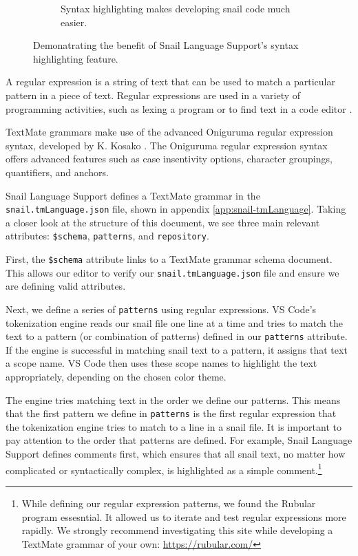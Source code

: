 \documentclass{article}
\begin{document}
\begin{figure}[b]
\begin{subfigure}[c][][c]{0.45\textwidth}
\begin{center}
            \caption{Syntax highlighting makes developing snail code much easier.}
            \label{fig:dev-with-highlight}
        \end{center}
    \end{subfigure}
    \caption{Demonatrating the benefit of Snail Language Support's syntax highlighting feature.}
    \label{fig:syntax-highlight}
\end{figure}

A regular expression is a string of text that can be used to match a particular pattern in a piece of text. Regular expressions are used in a variety of programming activities, such as lexing a program or to find text in a code editor \cite{ComputerHope_2022, Cornell_2022}. 

TextMate grammars make use of the advanced Oniguruma regular expression syntax, developed by K. Kosako \cite{Microsoft_2023h, MacroMates_2021b}. The Oniguruma regular expression syntax offers advanced features such as case insentivity options, character groupings, quantifiers, and anchors. 

Snail Language Support defines a TextMate grammar in the \lstinline{snail.tmLanguage.json} file, shown in appendix \ref{app:snail-tmLanguage}. Taking a closer look at the structure of this document, we see three main relevant attributes: \lstinline{$schema}, \lstinline{patterns}, and \lstinline{repository}. 

First, the \lstinline{$schema} attribute links to a TextMate grammar schema document. This allows our editor to verify our \lstinline{snail.tmLanguage.json} file and ensure we are defining valid attributes.

Next, we define a series of \lstinline{patterns} using regular expressions.  VS Code's tokenization engine reads our snail file one line at a time and tries to match the text to a pattern (or combination of patterns) defined in our \lstinline{patterns} attribute. If the engine is successful in matching snail text to a pattern, it assigns that text a scope name. VS Code then uses these scope names to highlight the text appropriately, depending on the chosen color theme. 

The engine tries matching text in the order we define our patterns. This means that the first pattern we define in \lstinline{patterns} is the first regular expression that the tokenization engine tries to match to a line in a snail file. It is important to pay attention to the order that patterns are defined. For example, Snail Language Support defines comments first, which ensures that all snail text, no matter how complicated or syntactically complex, is highlighted as a simple comment.\footnote{While defining our regular expression patterns, we found the Rubular program essesntial. It allowed us to iterate and test regular expressions more rapidly. We strongly recommend investigating this site while developing a TextMate grammar of your own: \url{https://rubular.com/}} 
\end{document}
